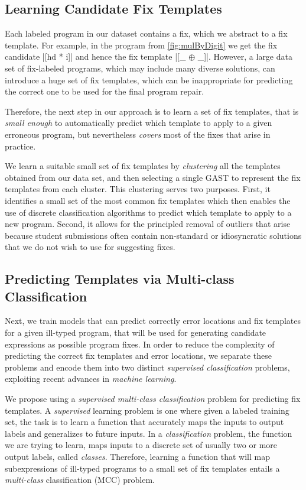 \subsection{Learning Candidate Fix Templates}
\label{sec:overview:learn}

Each labeled program in our dataset contains a fix, which we abstract to a fix
template. For example, in the \mbd program from \autoref{fig:mulByDigit} we get
the fix candidate |[hd * i]| and hence the fix template |[_ $\oplus$ _]|.
However, a large data set of fix-labeled programs, which may include many
diverse solutions, can introduce a huge set of fix templates, which can be
inappropriate for predicting the correct one to be used for the final program
repair.

Therefore, the next step in our approach is to learn a set of fix templates,
that is \emph{small enough} to automatically predict which template to apply to
a given erroneous program, but nevertheless \emph{covers} most of the fixes that
arise in practice.

 We learn a suitable small set of fix templates by
\emph{clustering} all the templates obtained from our data set, and then
selecting a single GAST to represent the fix templates from each cluster.
%
This clustering serves two purposes.
%
First, it identifies a small set of the most common fix templates which then
enables the use of discrete classification algorithms to predict which template
to apply to a new program.
%
Second, it allows for the principled removal of outliers that arise because
student submissions often contain non-standard or idiosyncratic solutions that
we do not wish to use for suggesting fixes.


\subsection{Predicting Templates via Multi-class Classification}
\label{sec:overview:predict}

Next, we train models that can predict correctly error locations and fix
templates for a given ill-typed program, that will be used for generating
candidate expressions as possible program fixes. In order to reduce the
complexity of predicting the correct fix templates and error locations, we
separate these problems and encode them into two distinct \emph{supervised
classification} problems, exploiting recent advances in \emph{machine learning}.

We propose using a \emph{supervised multi-class classification} problem for
predicting fix templates. A \emph{supervised} learning problem is one where
given a labeled training set, the task is to learn a function that accurately
maps the inputs to output labels and generalizes to future inputs. In a
\emph{classification} problem, the function we are trying to learn, maps inputs
to a discrete set of usually two or more output labels, called \emph{classes}.
Therefore, learning a function that will map subexpressions of ill-typed
programs to a small set of fix templates entails a \emph{multi-class}
classification (MCC) problem.

